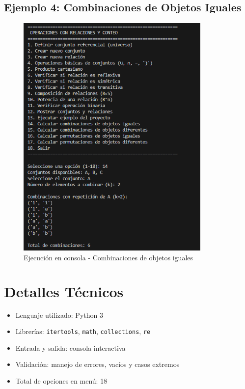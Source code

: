 \documentclass[12pt]{article}
\begin{document}
\subsection{Ejemplo 4: Combinaciones de Objetos Iguales}

\begin{figure}[H]
    \centering
    \includegraphics[width=0.85\textwidth]{Foto4.png}
    \caption{Ejecución en consola - Combinaciones de objetos iguales}
\end{figure}

\section{Detalles Técnicos}
\begin{itemize}
    \item Lenguaje utilizado: Python 3
    \item Librerías: \texttt{itertools}, \texttt{math}, \texttt{collections}, \texttt{re}
    \item Entrada y salida: consola interactiva
    \item Validación: manejo de errores, vacíos y casos extremos
    \item Total de opciones en menú: 18
\end{itemize}
\end{document}
